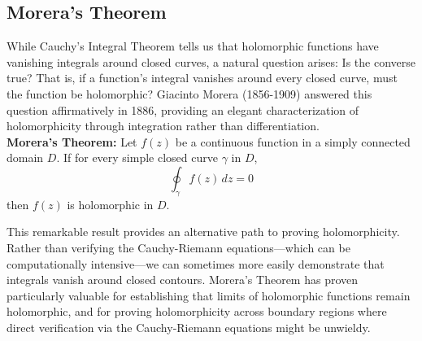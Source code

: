 \subsection*{Morera's Theorem} 

\noindent While Cauchy's Integral Theorem tells us that holomorphic functions have vanishing integrals around closed curves, a natural question arises: Is the converse true? That is, if a function's integral vanishes around every closed curve, must the function be holomorphic? Giacinto Morera (1856-1909) answered this question affirmatively in 1886, providing an elegant characterization of holomorphicity through integration rather than differentiation. \\

\noindent \textbf{Morera's Theorem:} Let $f(z)$ be a continuous function in a simply connected domain $D$. If for every simple closed curve $\gamma$ in $D$,
\[
\oint_{\gamma} f(z) \, dz = 0
\]
then $f(z)$ is holomorphic in $D$.

\noindent This remarkable result provides an alternative path to proving holomorphicity. Rather than verifying the Cauchy-Riemann equations—which can be computationally intensive—we can sometimes more easily demonstrate that integrals vanish around closed contours. Morera's Theorem has proven particularly valuable for establishing that limits of holomorphic functions remain holomorphic, and for proving holomorphicity across boundary regions where direct verification via the Cauchy-Riemann equations might be unwieldy.

